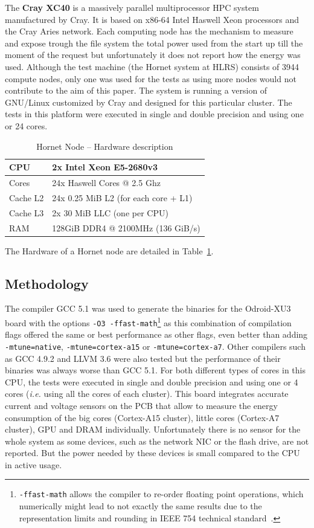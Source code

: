\documentclass{acm_proc_article-sp}
\begin{document}
The \textbf{Cray XC40}
is a massively parallel multiprocessor HPC system manufactured by Cray. It is based on x86-64 Intel Haswell Xeon processors and the Cray Aries network. Each computing node has the mechanism to measure and expose trough the file system the total power used from the start up till the moment of the request but unfortunately it does not report how the energy was used. Although the test machine (the Hornet system at HLRS) consists of 3944 compute nodes, only one was used for the tests as using more nodes would not contribute to the aim of this paper. The system is running a version of GNU/Linux customized by Cray and designed for this particular cluster. The tests in this platform were executed in single and double precision and using one or 24 cores.
\begin{table}[ht]
  \begin{center}
    \begin{tabular}{| l | p{6cm} |}
      \hline
      CPU & 2x Intel Xeon E5-2680v3 \\ \hline
      Cores & 24x Haswell Cores @ 2.5 Ghz  \\ \hline
      Cache L2 & 24x 0.25 MiB L2 (for each core + L1) \\ \hline
      Cache L3 & 2x 30 MiB LLC (one per CPU) \\ \hline
      RAM & 128GiB DDR4 @ 2100MHz (136 GiB/s)  \\ \hline
    \end{tabular}
    \caption{Hornet Node -- Hardware description}
    \label{tbl:hardware3}
  \end{center}
\end{table}
The Hardware of a Hornet node are detailed in Table~\ref{tbl:hardware3}.


\subsection{Methodology}
The compiler GCC 5.1 was used to generate the binaries for the Odroid-XU3 board with the options \texttt{-O3 -ffast-math}\footnote{\texttt{-ffast-math} allows the compiler to re-order floating point operations, which numerically might lead to not exactly the same results due to the representation limits and rounding in IEEE 754 technical standard~\cite{ieee:ieee754}.} as this combination of compilation flags offered the same or best performance as other flags, even better than adding \texttt{-mtune=native}, \texttt{-mtune=cortex-a15} or \texttt{-mtune=cortex-a7}. Other compilers such as GCC 4.9.2 and LLVM 3.6 were also tested but the performance of their binaries was always worse than GCC 5.1. For both different types of cores in this CPU, the tests were executed in single and double precision and using one or 4 cores (\textit{i.e.} using all the cores of each cluster).
This board integrates accurate current and voltage sensors on the PCB that allow to measure the energy consumption of the big cores (Cortex-A15 cluster), little cores (Cortex-A7 cluster), GPU and DRAM individually. Unfortunately there is no sensor for the whole system as some devices, such as the network NIC or the flash drive, are not reported. But the power needed by these devices is small compared to the CPU in active usage.
\end{document}

